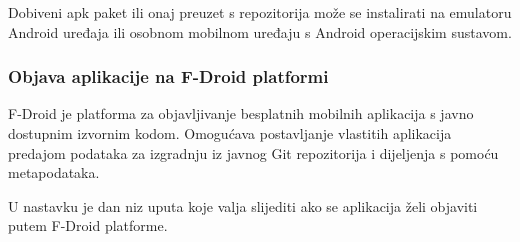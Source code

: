 			{Dobiveni apk paket ili onaj preuzet s repozitorija može se instalirati na emulatoru Android uređaja ili osobnom mobilnom uređaju s Android operacijskim sustavom.}
			
			\subsubsection{Objava aplikacije na F-Droid platformi}
			
			{F-Droid je platforma za objavljivanje besplatnih mobilnih aplikacija s javno dostupnim izvornim kodom. Omogućava postavljanje vlastitih aplikacija predajom podataka za izgradnju iz javnog Git repozitorija i dijeljenja s pomoću metapodataka.}
			
			{U nastavku je dan niz uputa koje valja slijediti ako se aplikacija želi objaviti putem F-Droid platforme.}

